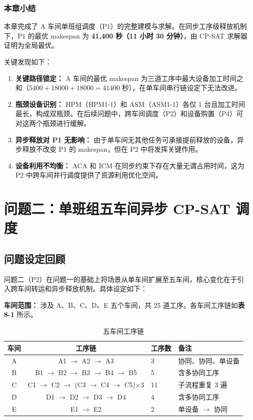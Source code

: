 \documentclass[UTF8,a4paper,12pt]{ctexart}
\begin{document}
\subsection{本章小结}
本章完成了 A 车间单班组调度（P1）的完整建模与求解。在同步工序级释放机制下，P1 的最优 makespan 为 \textbf{41,400 秒（11 小时 30 分钟）}，由 CP-SAT 求解器证明为全局最优。

关键发现如下：
\begin{enumerate}
\item \textbf{关键路径锁定：} A 车间的最优 makespan 为三道工序中最大设备加工时间之和（$5400 + 18000 + 18000 = 41400$ 秒），在单车间串行链设定下无法改进。
\item \textbf{瓶颈设备识别：} HPM（HPM1-1）和 ASM（ASM1-1）各仅 1 台且加工时间最长，构成双瓶颈。在后续问题中，跨车间调度（P2）和设备购置（P4）可对这两个瓶颈进行缓解。
\item \textbf{异步释放对 P1 无影响：} 由于单车间无其他任务可承接提前释放的设备，异步释放不改变 P1 的 makespan，但在 P2 中将发挥关键作用。
\item \textbf{设备利用不均衡：} ACA 和 ICM 在同步约束下存在大量无谓占用时间，这为 P2 中跨车间并行调度提供了资源利用优化空间。
\end{enumerate}

\chapter{问题二：单班组五车间异步 CP-SAT 调度}

\section{问题设定回顾}
问题二（P2）在问题一的基础上将场景从单车间扩展至五车间，核心变化在于引入跨车间转运和异步释放机制。具体设定如下：

\textbf{车间范围：} 涉及 A、B、C、D、E 五个车间，共 25 道工序。各车间工序链如\textbf{表 8-1} 所示。

\begin{table}[htbp]
  \centering
  \caption{五车间工序链}
  \label{tab:process_chain}
  \begin{tabular}{ccll}
    \toprule
    车间 & 工序链 & 工序数 & 备注 \\
    \midrule
    A & A1 $\to$ A2 $\to$ A3 & 3 & 协同、协同、单设备 \\
    B & B1 $\to$ B2 $\to$ B3 $\to$ B4 $\to$ B5 & 5 & 含多协同工序 \\
    C & C1 $\to$ C2 $\to$ (C3 $\to$ C4 $\to$ C5)$\times$3 & 11 & 子流程重复 3 遍 \\
    D & D1 $\to$ D2 $\to$ D3 $\to$ D4 & 4 & 含多协同工序 \\
    E & E1 $\to$ E2 & 2 & 单设备 $\to$ 协同 \\
    \bottomrule
  \end{tabular}
\end{table}
\end{document}
